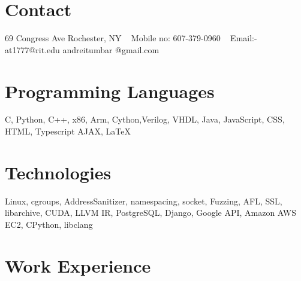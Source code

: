 \documentclass[print]{cv-style}          %
\begin{document}


\begin{aside}
%
\section{Contact}
69 Congress Ave 
Rochester, NY
~
Mobile no:
607-379-0960
~
Email:-
at1777@rit.edu
andreitumbar
@gmail.com
%
%
\section{Programming
   Languages}
C, Python, C++,
x86, Arm,
Cython,Verilog,
VHDL, Java, JavaScript,
CSS, HTML, Typescript
AJAX, \LaTeX{}
%
%
\section{Technologies}
Linux, cgroups,
AddressSanitizer,
namespacing, socket,
Fuzzing, AFL,
SSL, libarchive,
CUDA, LLVM IR,
PostgreSQL, Django,
Google API,
Amazon AWS EC2,
CPython, libclang
%
\end{aside}



\section{Work Experience}
\end{document}

